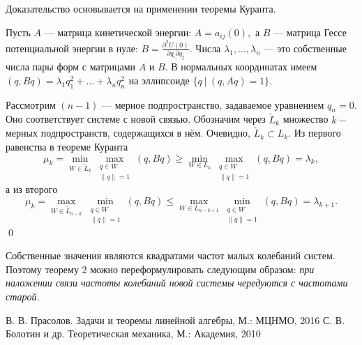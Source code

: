 \documentclass[11pt,a4paper]{article}
\begin{document}
Доказательство основывается на применении теоремы Куранта.

Пусть $A$ --- матрица кинетической энергии: $A=a_{ij}(0),$ а $B$ --- матрица Гессе потенциальной энергии в нуле: $B=\frac{\partial^2 U(0)}{\partial q_i\partial q_j}.$ Числа $\lambda_1,\ldots,\lambda_n$ --- это собственные числа пары форм с матрицами $A$ и $B.$ В нормальных координатах имеем $(q,Bq)=\lambda_1q_1^2+\ldots+\lambda_nq_n^2$ на эллипсоиде $\{q~|~(q,Aq)=1\}.$

Рассмотрим $(n-1)$ --- мерное подпространство, задаваемое уравнением $q_n=0$. Оно соответствует системе с новой связью. Обозначим через $\tilde L_k$ множество $k-$мерных подпространств, содержащихся в нём. Очевидно, $\tilde L_k\subset L_k.$
Из первого равенства в теореме Куранта
$$\mu_k=\min_{W\in \tilde L_{k}}\max_{\substack{q\in W\\\|q\|=1}}(q,Bq)\geqslant\min_{W\in L_{k}}\max_{\substack{q\in W\\\|q\|=1}}(q,Bq)=\lambda_k,$$
а из второго
$$\mu_k=\max_{W\in\tilde L_{n-k}}\min_{\substack{q\in W\\\|q\|=1}}(q,Bq)\leqslant\max_{W\in L_{n-k+1}}\min_{\substack{q\in W\\\|q\|=1}}(q,Bq)=\lambda_{k+1}.$$
\qed

Собственные значения являются квадратами частот малых колебаний систем. Поэтому теорему 2 можно переформулировать следующим образом:
\slshape при наложении связи частоты колебаний новой системы чередуются с частотами старой.\upshape
\begin{thebibliography}{3}
В. В. Прасолов.	Задачи и теоремы линейной алгебры, М.: МЦНМО, 2016
С. В. Болотин и др. Теоретическая механика, М.: Академия, 2010
\end{thebibliography}
\end{document}
